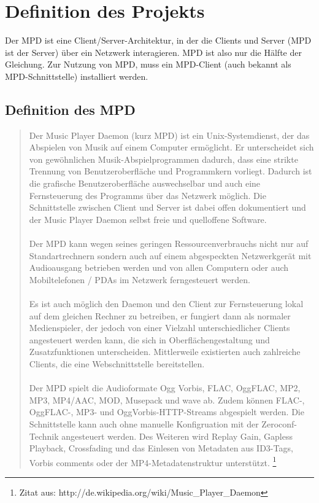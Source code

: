 \chapter{Definition des Projekts}
Der MPD ist eine Client/Server-Architektur, in der die Clients und Server (MPD ist der Server)
über ein Netzwerk interagieren. MPD ist also nur die Hälfte der Gleichung. Zur Nutzung von 
MPD, muss ein MPD-Client (auch bekannt als MPD-Schnittstelle) installiert werden.
\section{Definition des MPD}
\begin{quote}
Der Music Player Daemon (kurz MPD) ist ein Unix-Systemdienst, der das Abspielen von Musik auf 
einem Computer ermöglicht. Er unterscheidet sich von gewöhnlichen Musik-Abspielprogrammen dadurch, 
dass eine strikte Trennung von Benutzeroberfläche und Programmkern vorliegt. Dadurch ist die 
grafische Benutzeroberfläche auswechselbar und auch eine Fernsteuerung des Programms über das 
Netzwerk möglich. Die Schnittstelle zwischen Client und Server ist dabei offen dokumentiert und 
der Music Player Daemon selbst freie und quelloffene Software.\ \\ \\
Der MPD kann wegen seines geringen Ressourcenverbrauchs nicht nur auf Standartrechnern sondern 
auch auf einem abgespeckten Netzwerkgerät mit Audioausgang betrieben werden und von allen Computern
oder auch Mobiltelefonen / PDAs im Netzwerk ferngesteuert werden.\ \\ \\
Es ist auch möglich den Daemon und den Client zur Fernsteuerung lokal auf dem gleichen Rechner
zu betreiben, er fungiert dann als normaler Medienspieler, der jedoch von einer Vielzahl 
unterschiedlicher Clients angesteuert werden kann, die sich in Oberflächengestaltung und Zusatzfunktionen
unterscheiden. Mittlerweile existierten auch zahlreiche Clients, die eine Webschnittstelle bereitstellen.\ \\ \\
Der MPD spielt die Audioformate Ogg Vorbis, FLAC, OggFLAC, MP2, MP3, MP4/AAC, MOD, Musepack und wave ab.
Zudem können FLAC-, OggFLAC-, MP3- und OggVorbis-HTTP-Streams abgespielt werden. Die Schnittstelle kann
auch ohne manuelle Konfigruation mit der Zeroconf-Technik angesteuert werden. Des Weiteren wird Replay
Gain, Gapless Playback, Crossfading und das Einlesen von Metadaten aus ID3-Tags, Vorbis comments oder
der MP4-Metadatenstruktur unterstützt.
\footnote{Zitat aus: http://de.wikipedia.org/wiki/Music\_Player\_Daemon}
\end{quote}
\newpage
